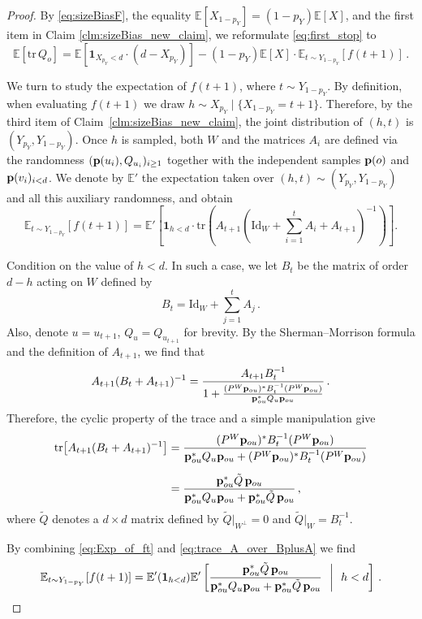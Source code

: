 \documentclass[10pt,a4paper]{amsart}
\numberwithin{equation}{section}
\newcommand{\E}{\mathbb E}
\newcommand{\p}{{\bf p}}
\newcommand{\tr}{{\mathrm {tr}}}
\newcommand{\Id}{\mathrm{Id}}
\begin{document}
\begin{proof}
By \eqref{eq:sizeBiasF}, the equality $\E[X_{1-p_Y}]=(1-p_Y)\E[X]$, and the first item in Claim \ref{clm:sizeBias_new_claim}, we reformulate \eqref{eq:first_stop} to
\begin{equation}\label{eq:ft}
\E[\tr\,Q_o]=\E[\mathbf 1_{X_{p_Y}<d}\cdot (d-X_{p_Y})]- 
(1-p_Y)\E[X]\cdot\E_{t\sim Y_{1-p_Y}}\left[f(t+1) \right]\,.    
\end{equation}

We turn to study the expectation of $f(t+1)$, where $t\sim Y_{1-p_Y}$. 
By definition, when evaluating $f(t+1)$ we draw
$h\sim X_{p_Y}\mid \{X_{1-p_Y}=t+1\}$. Therefore, by the third item of
Claim~\ref{clm:sizeBias_new_claim}, the joint distribution of $(h,t)$ is
$(Y_{p_Y},Y_{1-p_Y})$. Once $h$ is sampled, both $W$ and the matrices $A_i$ are defined via the randomness $(\p(u_i),Q_{u_i})_{i\ge 1}$ together with the independent samples $\p(o)$ and $\p(v_i)_{i<d}$. We denote by $\E'$ the expectation taken over $(h,t)\sim(Y_{p_Y},Y_{1-p_Y})$ and all this auxiliary randomness, and obtain
\begin{equation}\label{eq:Exp_of_ft}
    \E_{t\sim Y_{1-p_Y}}\!\left[f(t+1) \right]
    = \E'\!\left[ 
        \mathbf{1}_{h<d}\cdot 
\tr\!\left(A_{t+1} \left(\Id_W + \sum_{i=1}^{t}A_i+A_{t+1}\right)^{-1}\right)
    \right].
\end{equation}

Condition on the value of $h<d$. In such a case, we let $B_t$ be the matrix of order $d-h$ acting on $W$ defined by 
$$B_t=\Id_W + \sum_{j=1}^{t}A_j\,.$$ Also, denote $u=u_{t+1}$, $Q_u=Q_{u_{t+1}}$ for brevity. By the Sherman--Morrison formula and the definition of $A_{t+1}$, we find that
\[
A_{t+1}(B_t+A_{t+1})^{-1} = \frac{A_{t+1}B_t^{-1}}{1+\frac{(P^W\p_{ou})^*B_t^{-1}(P^W\p_{ou})}{\p_{ou}^*Q_{u}\p_{ou}}}\,.
\]
Therefore, the cyclic property of the trace and a simple manipulation give
\begin{align}
\tr\!\left[A_{t+1}(B_t+A_{t+1})^{-1}\right]
&= \frac{(P^W\p_{ou})^*B_t^{-1}(P^W\p_{ou})}{\p_{ou}^*Q_{u}\p_{ou}+(P^W\p_{ou})^*B_t^{-1}(P^W\p_{ou})} \nonumber\\[0.6em]
&= \frac{\p_{ou}^*\tilde Q\,\p_{ou}}{\p_{ou}^*Q_{u}\p_{ou}+\p_{ou}^*\tilde Q\,\p_{ou}}\,, \label{eq:trace_A_over_BplusA}
\end{align}
where $\tilde Q$ denotes a $d\times d$ matrix defined by $\tilde Q|_{W^\perp}=0$ and $\tilde Q|_W = B_t^{-1}$.

By combining \eqref{eq:Exp_of_ft} and \eqref{eq:trace_A_over_BplusA} we find
\begin{equation}\label{eq:almost_there}
\E_{t\sim Y_{1-p_Y}}[f(t+1)]=\E'(\mathbf 1_{h<d})\E'\left[ \frac{\p_{ou}^*\tilde Q\,\p_{ou}}{\p_{ou}^*Q_{u}\p_{ou}+\p_{ou}^*\tilde Q\,\p_{ou}} ~~\middle |~~ h<d \right]\,.  
\end{equation}


\end{proof}
\end{document}

